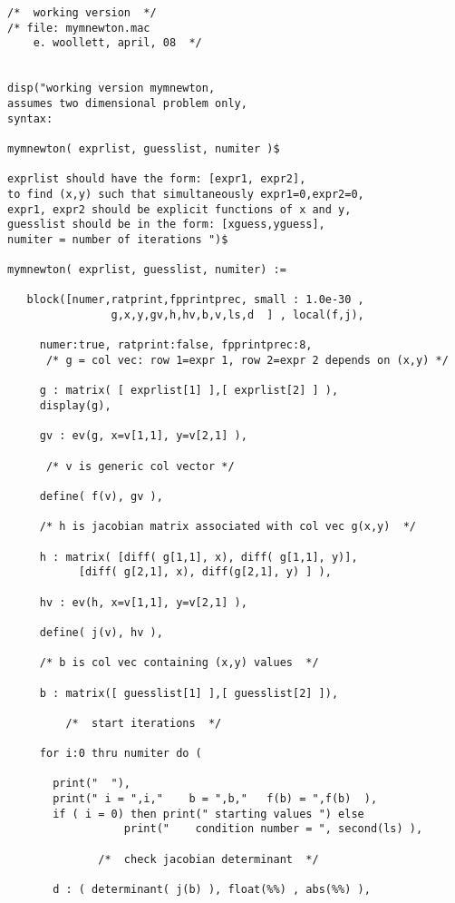 \documentclass[12pt]{article}
\begin{document}
\begin{verbatim}
/*  working version  */   
/* file: mymnewton.mac
    e. woollett, april, 08  */

   
disp("working version mymnewton,
assumes two dimensional problem only,
syntax: 

mymnewton( exprlist, guesslist, numiter )$

exprlist should have the form: [expr1, expr2],
to find (x,y) such that simultaneously expr1=0,expr2=0,
expr1, expr2 should be explicit functions of x and y,
guesslist should be in the form: [xguess,yguess],
numiter = number of iterations ")$

mymnewton( exprlist, guesslist, numiter) :=

   block([numer,ratprint,fpprintprec, small : 1.0e-30 ,
                g,x,y,gv,h,hv,b,v,ls,d  ] , local(f,j),
              
     numer:true, ratprint:false, fpprintprec:8,
      /* g = col vec: row 1=expr 1, row 2=expr 2 depends on (x,y) */
      
     g : matrix( [ exprlist[1] ],[ exprlist[2] ] ),
     display(g),
   
     gv : ev(g, x=v[1,1], y=v[2,1] ), 
   
      /* v is generic col vector */
         
     define( f(v), gv ), 
   
     /* h is jacobian matrix associated with col vec g(x,y)  */
     
     h : matrix( [diff( g[1,1], x), diff( g[1,1], y)],
           [diff( g[2,1], x), diff(g[2,1], y) ] ), 
           
     hv : ev(h, x=v[1,1], y=v[2,1] ), 
   
     define( j(v), hv ), 
     
     /* b is col vec containing (x,y) values  */
     
     b : matrix([ guesslist[1] ],[ guesslist[2] ]),
    
         /*  start iterations  */
         
     for i:0 thru numiter do (
     
       print("  "),
       print(" i = ",i,"    b = ",b,"   f(b) = ",f(b)  ),
       if ( i = 0) then print(" starting values ") else 
                  print("    condition number = ", second(ls) ),
     
              /*  check jacobian determinant  */
              
       d : ( determinant( j(b) ), float(%%) , abs(%%) ),
                

\end{verbatim}
\end{document}
